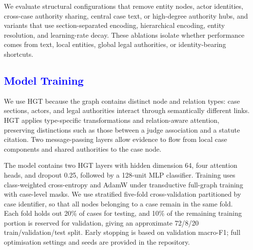 \documentclass[runningheads]{llncs}
\begin{document}
We evaluate structural configurations that remove entity nodes, actor identities, cross-case authority sharing, central case text, or high-degree authority hubs, and variants that use section-separated encoding, hierarchical encoding, entity resolution, and learning-rate decay. These ablations isolate whether performance comes from text, local entities, global legal authorities, or identity-bearing shortcuts.

\subsection{\textcolor{blue}{Model Training}}
\label{subsec:pipeline-training}

{\color{blue}
We use HGT because the graph contains distinct node and relation types:
case sections, actors, and legal authorities interact through semantically
different links. HGT applies type-specific transformations and
relation-aware attention, preserving distinctions such as those between a
judge association and a statute citation. Two message-passing layers allow
evidence to flow from local case components and shared authorities to the
case node.

The model contains two HGT layers with hidden dimension 64, four attention
heads, and dropout 0.25, followed by a 128-unit MLP classifier. Training uses
class-weighted cross-entropy and AdamW under transductive full-graph training
with case-level masks. We use stratified five-fold cross-validation partitioned by case
identifier, so that all nodes belonging to a case remain in the same
fold. Each fold holds out 20\% of cases for testing, and 10\% of the
remaining training portion is reserved for validation, giving an
approximate 72/8/20 train/validation/test split. Early stopping is based
on validation macro-F1; full optimisation settings and seeds are provided in
the repository. 
}
\end{document}
